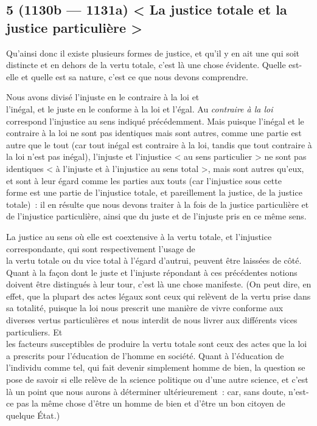\documentclass[french,twoside]{book} %
\begin{document}
\subsection[{5 (1130b — 1131a) < La justice totale et la justice particulière >}]{5 (1130b — 1131a) < La justice totale et la justice particulière >}
\noindent Qu’ainsi donc il existe plusieurs formes de justice, et qu’il y en ait une qui soit distincte et en dehors de la vertu totale, c’est là une chose évidente. Quelle est-elle et quelle est sa nature, c’est ce que nous devons comprendre.\par
Nous avons divisé l’injuste en le contraire à la loi et \\
l’inégal, et le juste en le conforme à la loi et l’égal. Au {\itshape contraire à la loi} correspond l’injustice au sens indiqué précédemment. Mais puisque l’inégal et le contraire à la loi ne sont pas identiques mais sont autres, comme une partie est autre que le tout (car tout inégal est contraire à la loi, tandis que tout contraire à la loi n’est pas inégal), l’injuste et l’injustice < au sens particulier > ne sont pas identiques < à l’injuste et à l’injustice au sens total >, mais sont autres qu’eux, et sont à leur égard comme les parties aux touts (car l’injustice sous cette \\
forme est une partie de l’injustice totale, et pareillement la justice, de la justice totale) : il en résulte que nous devons traiter à la fois de la justice particulière et de l’injustice particulière, ainsi que du juste et de l’injuste pris en ce même sens.\par
La justice au sens où elle est coextensive à la vertu totale, et l’injustice correspondante, qui sont respectivement l’usage de \\
la vertu totale ou du vice total à l’égard d’autrui, peuvent être laissées de côté. Quant à la façon dont le juste et l’injuste répondant à ces précédentes notions doivent être distingués à leur tour, c’est là une chose manifeste. (On peut dire, en effet, que la plupart des actes légaux sont ceux qui relèvent de la vertu prise dans sa totalité, puisque la loi nous prescrit une manière de vivre conforme aux diverses vertus particulières et nous interdit de nous livrer aux différents vices particuliers. Et \\
les facteurs susceptibles de produire la vertu totale sont ceux des actes que la loi a prescrits pour l’éducation de l’homme en société. Quant à l’éducation de l’individu comme tel, qui fait devenir simplement homme de bien, la question se pose de savoir si elle relève de la science politique ou d’une autre science, et c’est là un point que nous aurons à déterminer ultérieurement : car, sans doute, n’est-ce pas la même chose d’être un homme de bien et d’être un bon citoyen de quelque État.)\par
\end{document}
